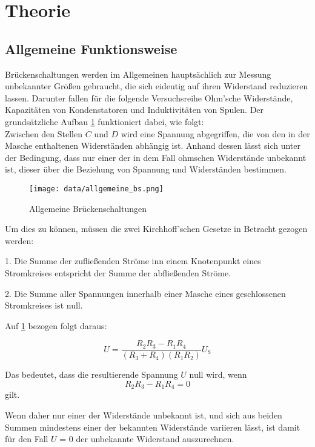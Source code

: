 \section{Theorie}
\label{sec:Theorie}

\subsection{Allgemeine Funktionsweise}

Brückenschaltungen werden im Allgemeinen hauptsächlich zur Messung unbekannter Größen 
gebraucht, die sich eideutig auf ihren Widerstand reduzieren lassen. Darunter fallen für
die folgende Versuchsreihe Ohm'sche Widerstände, Kapazitäten von Kondenstatoren und 
Induktivitäten von Spulen. Der grundsätzliche Aufbau \ref{fig:allg} funktioniert dabei, wie folgt:\\
Zwischen den Stellen $C$ und $D$ wird eine Spannung abgegriffen, die von den in der Masche 
enthaltenen Widerständen abhängig ist. Anhand dessen lässt sich unter der Bedingung, dass 
nur einer der in dem Fall ohmschen Widerstände unbekannt ist, dieser über die Beziehung
von Spannung und Widerständen bestimmen. 
\begin{figure}
\centering
\texttt{[image: data/allgemeine\_bs.png]}
\caption{Allgemeine Brückenschaltungen}
\label{fig:allg}
\end{figure}

Um dies zu können, müssen die zwei Kirchhoff'schen Gesetze in Betracht gezogen werden:

1.  Die Summe der zufließenden Ströme inn einem Knotenpunkt eines Stromkreises entspricht
    der Summe der abfließenden Ströme.

2.  Die Summe aller Spannungen innerhalb einer Masche eines geschlossenen Stromkreises
    ist null.

Auf \ref{fig:allg} bezogen folgt daraus:

\begin{equation}
    U = \frac{{R_2}{R_3}-{R_1}{R_4}}{({R_3}+{R_4})({R_1}{R_2})}U_{\text{S}} 
\end{equation}

Das bedeutet, dass die resultierende Spannung $U$ null wird, wenn 
\begin{equation}
    \label{null}
    R_2 R_3 - R_1 R_4 = 0
\end{equation}
gilt.

Wenn daher nur einer der Widerstände unbekannt ist, und sich aus beiden Summen mindestens einer
der bekannten Widerstände variieren lässt, ist damit für den Fall $U$ = 0 der unbekannte Widerstand
auszurechnen.

